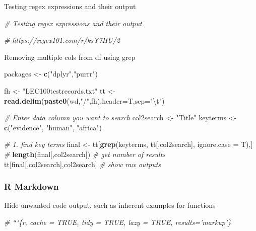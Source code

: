 \documentclass[10,portrait]{article}
\newenvironment{Shaded}{\begin{snugshade}}{\end{snugshade}}
\newcommand{\KeywordTok}[1]{\textcolor[rgb]{0.13,0.29,0.53}{\textbf{#1}}}
\newcommand{\DataTypeTok}[1]{\textcolor[rgb]{0.13,0.29,0.53}{#1}}
\newcommand{\CharTok}[1]{\textcolor[rgb]{0.31,0.60,0.02}{#1}}
\newcommand{\StringTok}[1]{\textcolor[rgb]{0.31,0.60,0.02}{#1}}
\newcommand{\CommentTok}[1]{\textcolor[rgb]{0.56,0.35,0.01}{\textit{#1}}}
\newcommand{\NormalTok}[1]{#1}
\begin{document}
Testing regex expressions and their output

\begin{Shaded}
\begin{Highlighting}[]
\CommentTok{# Testing regex expressions and their output   }

\CommentTok{# https://regex101.com/r/ksY7HU/2}
\end{Highlighting}
\end{Shaded}

Removing multiple cols from df using grep

\begin{Shaded}
\begin{Highlighting}[]
\NormalTok{packages <-}\StringTok{ }\KeywordTok{c}\NormalTok{(}\StringTok{"dplyr"}\NormalTok{,}\StringTok{"purrr"}\NormalTok{) }

\NormalTok{fh <-}\StringTok{ "LEC100testrecords.txt"}
\NormalTok{tt <-}\StringTok{ }\KeywordTok{read.delim}\NormalTok{(}\KeywordTok{paste0}\NormalTok{(wd,}\StringTok{"/"}\NormalTok{,fh),}\DataTypeTok{header=}\NormalTok{T,}\DataTypeTok{sep=}\StringTok{"}\CharTok{\textbackslash{}t}\StringTok{"}\NormalTok{)}

\CommentTok{# Enter data column you want to search  }
\NormalTok{col2search <-}\StringTok{ "Title"}
\NormalTok{keyterms <-}\StringTok{ }\KeywordTok{c}\NormalTok{(}\StringTok{"evidence"}\NormalTok{, }\StringTok{"human"}\NormalTok{, }\StringTok{"africa"}\NormalTok{)}

\CommentTok{# 1. find key terms}
\NormalTok{final <-}\StringTok{ }\NormalTok{tt[}\KeywordTok{grep}\NormalTok{(keyterms, tt[,col2search], }\DataTypeTok{ignore.case =}\NormalTok{ T),] }\CommentTok{#}
\KeywordTok{length}\NormalTok{(final[,col2search]) }\CommentTok{# get number of results}
\NormalTok{tt[final[,col2search],col2search] }\CommentTok{# show raw outputs }
\end{Highlighting}
\end{Shaded}

\subsubsection{R Markdown}\label{r-markdown}

Hide unwanted code output, such as inherent examples for functions

\begin{Shaded}
\begin{Highlighting}[]
\CommentTok{# ```\{r, cache = TRUE, tidy = TRUE, lazy = TRUE, results='markup'\}}
\end{Highlighting}
\end{Shaded}
\end{document}
